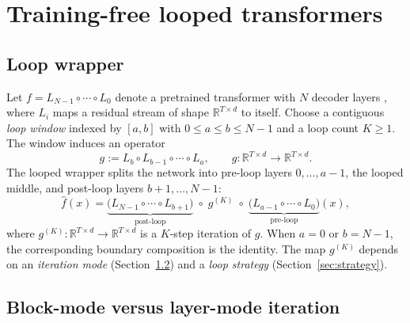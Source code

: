 

\section{Training-free looped transformers}
\label{sec:method}

\subsection{Loop wrapper}
\label{sec:wrapper}



Let $f = L_{N-1} \circ \cdots \circ L_0$ denote a pretrained transformer with $N$ decoder layers \citep{vaswani2017attention,qwen3,llama3,deepseekv2,moonlight}, where $L_i$ maps a residual stream of shape $\mathbb{R}^{T \times d}$ to itself. Choose a contiguous \emph{loop window} indexed by $[a, b]$ with $0 \le a \le b \le N-1$ and a loop count $K \ge 1$. The window induces an operator \begin{equation}
g := L_b \circ L_{b-1} \circ \cdots \circ L_a,
\qquad g : \mathbb{R}^{T \times d} \to \mathbb{R}^{T \times d}.
\label{eq:block-op}
\end{equation}
The looped wrapper splits the network into pre-loop layers $0, \ldots, a-1$, the looped middle, and post-loop layers $b+1, \ldots, N-1$:
\begin{equation}
\hat f(x) =
\underbrace{\bigl(L_{N-1} \circ \cdots \circ L_{b+1}\bigr)}_{\text{post-loop}}
\;\circ\; g^{(K)} \;\circ\;
\underbrace{\bigl(L_{a-1} \circ \cdots \circ L_0\bigr)}_{\text{pre-loop}}(x),
\label{eq:wrapper}
\end{equation}
where $g^{(K)} : \mathbb{R}^{T \times d} \to \mathbb{R}^{T \times d}$ is a $K$-step iteration of $g$. When $a = 0$ or $b = N-1$, the corresponding boundary composition is the identity. The map $g^{(K)}$ depends on an \emph{iteration mode} (Section~\ref{sec:layer-mode}) and a \emph{loop strategy} (Section~\ref{sec:strategy}).

\subsection{Block-mode versus layer-mode iteration}
\label{sec:layer-mode}

